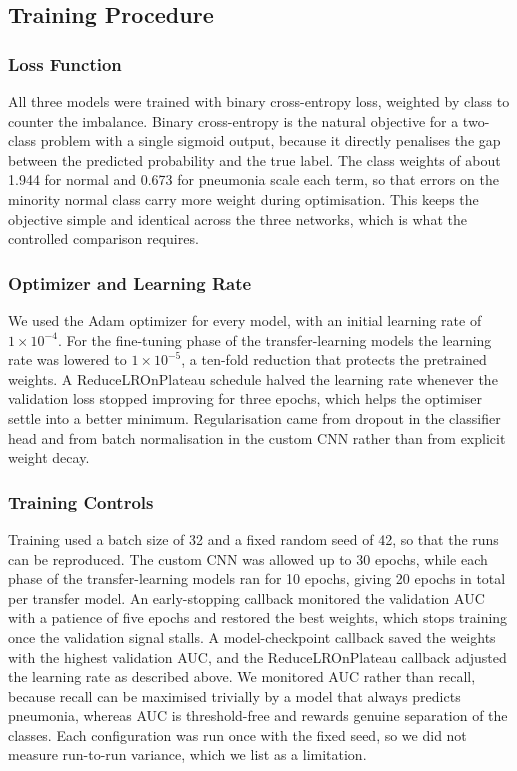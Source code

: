 \documentclass[preprint,12pt]{elsarticle}
\begin{document}
\subsection{Training Procedure}
\subsubsection{Loss Function}
All three models were trained with binary cross-entropy loss, weighted by class to counter the imbalance.
Binary cross-entropy is the natural objective for a two-class problem with a single sigmoid output, because it directly penalises the gap between the predicted probability and the true label.
The class weights of about 1.944 for normal and 0.673 for pneumonia scale each term, so that errors on the minority normal class carry more weight during optimisation.
This keeps the objective simple and identical across the three networks, which is what the controlled comparison requires.

\subsubsection{Optimizer and Learning Rate}
We used the Adam optimizer for every model, with an initial learning rate of $1\times10^{-4}$.
For the fine-tuning phase of the transfer-learning models the learning rate was lowered to $1\times10^{-5}$, a ten-fold reduction that protects the pretrained weights.
A ReduceLROnPlateau schedule halved the learning rate whenever the validation loss stopped improving for three epochs, which helps the optimiser settle into a better minimum.
Regularisation came from dropout in the classifier head and from batch normalisation in the custom CNN rather than from explicit weight decay.

\subsubsection{Training Controls}
Training used a batch size of 32 and a fixed random seed of 42, so that the runs can be reproduced.
The custom CNN was allowed up to 30 epochs, while each phase of the transfer-learning models ran for 10 epochs, giving 20 epochs in total per transfer model.
An early-stopping callback monitored the validation AUC with a patience of five epochs and restored the best weights, which stops training once the validation signal stalls.
A model-checkpoint callback saved the weights with the highest validation AUC, and the ReduceLROnPlateau callback adjusted the learning rate as described above.
We monitored AUC rather than recall, because recall can be maximised trivially by a model that always predicts pneumonia, whereas AUC is threshold-free and rewards genuine separation of the classes.
Each configuration was run once with the fixed seed, so we did not measure run-to-run variance, which we list as a limitation.
\end{document}
